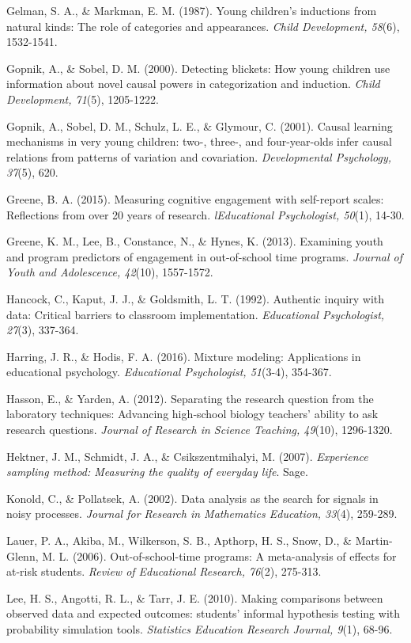 \documentclass[]{msu-thesis}
\theoremstyle{definition}
\theoremstyle{definition}
\theoremstyle{definition}
\theoremstyle{remark}
\begin{document}
Gelman, S. A., \& Markman, E. M. (1987). Young children's inductions
from natural kinds: The role of categories and appearances. \emph{Child
Development, 58}(6), 1532-1541.

Gopnik, A., \& Sobel, D. M. (2000). Detecting blickets: How young
children use information about novel causal powers in categorization and
induction. \emph{Child Development, 71}(5), 1205-1222.

Gopnik, A., Sobel, D. M., Schulz, L. E., \& Glymour, C. (2001). Causal
learning mechanisms in very young children: two-, three-, and
four-year-olds infer causal relations from patterns of variation and
covariation. \emph{Developmental Psychology, 37}(5), 620.

Greene, B. A. (2015). Measuring cognitive engagement with self-report
scales: Reflections from over 20 years of research. \emph{lEducational
Psychologist, 50}(1), 14-30.

Greene, K. M., Lee, B., Constance, N., \& Hynes, K. (2013). Examining
youth and program predictors of engagement in out-of-school time
programs. \emph{Journal of Youth and Adolescence, 42}(10), 1557-1572.

Hancock, C., Kaput, J. J., \& Goldsmith, L. T. (1992). Authentic inquiry
with data: Critical barriers to classroom implementation.
\emph{Educational Psychologist, 27}(3), 337-364.

Harring, J. R., \& Hodis, F. A. (2016). Mixture modeling: Applications
in educational psychology. \emph{Educational Psychologist, 51}(3-4),
354-367.

Hasson, E., \& Yarden, A. (2012). Separating the research question from
the laboratory techniques: Advancing high‐school biology teachers'
ability to ask research questions. \emph{Journal of Research in Science
Teaching, 49}(10), 1296-1320.

Hektner, J. M., Schmidt, J. A., \& Csikszentmihalyi, M. (2007).
\emph{Experience sampling method: Measuring the quality of everyday
life}. Sage.

Konold, C., \& Pollatsek, A. (2002). Data analysis as the search for
signals in noisy processes. \emph{Journal for Research in Mathematics
Education, 33}(4), 259-289.

Lauer, P. A., Akiba, M., Wilkerson, S. B., Apthorp, H. S., Snow, D., \&
Martin-Glenn, M. L. (2006). Out-of-school-time programs: A meta-analysis
of effects for at-risk students. \emph{Review of Educational Research,
76}(2), 275-313.

Lee, H. S., Angotti, R. L., \& Tarr, J. E. (2010). Making comparisons
between observed data and expected outcomes: students' informal
hypothesis testing with probability simulation tools. \emph{Statistics
Education Research Journal, 9}(1), 68-96.
\end{document}

